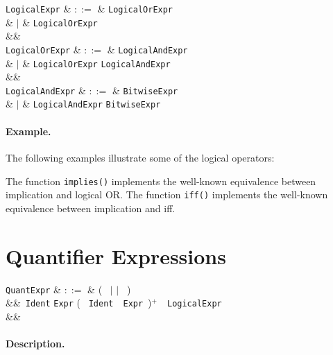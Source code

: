 \begin{syntax}
  \verb+LogicalExpr+ & $::=$ & \verb+LogicalOrExpr+ \big[ \token{<==>} \verb+LogicalExpr+\ \big]\\
                     &  $|$  & \verb+LogicalOrExpr+ \big[ \token{==>} \verb+LogicalExpr+\ \big]\\
  &&\\
  \verb+LogicalOrExpr+ & $::=$ & \verb+LogicalAndExpr+ \\
                           & $|$ & \verb+LogicalOrExpr+ \token{||} \verb+LogicalAndExpr+\\
  &&\\
  \verb+LogicalAndExpr+ & $::=$ & \verb+BitwiseExpr+ \\
                            & $|$ & \verb+LogicalAndExpr+ \token{\&\&} \verb+BitwiseExpr+\\
\end{syntax}

\paragraph{Example.}  The following examples illustrate some of the logical operators:



The function \lstinline{implies()} implements the well-known equivalence between implication and logical OR.  The function \lstinline{iff()} implements the well-known equivalence between implication and iff.


\section{Quantifier Expressions}
\label{c_expr_quantifier}

\begin{syntax}
\verb+QuantExpr+ & $::=$ & \big(\  $|$  $|$
\ \big)\ \token{\{}\\
&&\ \verb+Ident+  \verb+Expr+ \big( \token{,}\ \verb+Ident+\
\ \verb+Expr+\ \big)$^+$\ \token{|}\ \verb+LogicalExpr+\\
&& \token{\}}\\
\end{syntax}

\paragraph{Description.}

